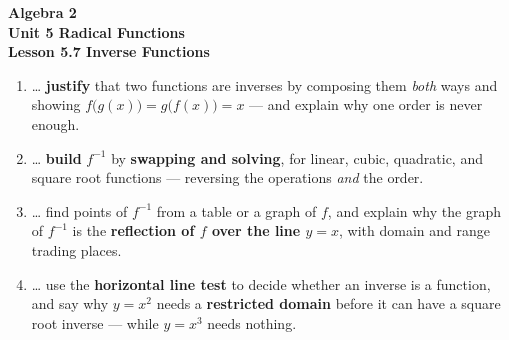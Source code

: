 \documentclass[10pt]{article}
\begin{document}
\vspace{-0.8in}

\begin{center}
  {\color{white}\textbf{\LARGE Algebra 2}}\\[4pt]
  {\color{forestmid}\large\textbf{Unit 5 \quad Radical Functions}}\\[6pt]
  {\color{white}\textbf{\large Lesson 5.7 \quad Inverse Functions}}
\end{center}

\vspace{0.22in}
\namedateperiod
\vspace{0.18in}

\begin{learningtargetbox}
\small
\begin{enumerate}[leftmargin=1.5em, itemsep=5pt]
  \item \ldots{} \textbf{justify} that two functions are inverses by composing them \emph{both} ways and showing $f\big(g(x)\big)=g\big(f(x)\big)=x$ --- and explain why one order is never enough.
  \item \ldots{} \textbf{build} $f^{-1}$ by \textbf{swapping and solving}, for linear, cubic, quadratic, and square root functions --- reversing the operations \emph{and} the order.
  \item \ldots{} find points of $f^{-1}$ from a table or a graph of $f$, and explain why the graph of $f^{-1}$ is the \textbf{reflection of $f$ over the line $y=x$}, with domain and range trading places.
  \item \ldots{} use the \textbf{horizontal line test} to decide whether an inverse is a function, and say why $y=x^{2}$ needs a \textbf{restricted domain} before it can have a square root inverse --- while $y=x^{3}$ needs nothing.
\end{enumerate}
\end{learningtargetbox}

\vspace{0.14in}
\end{document}
